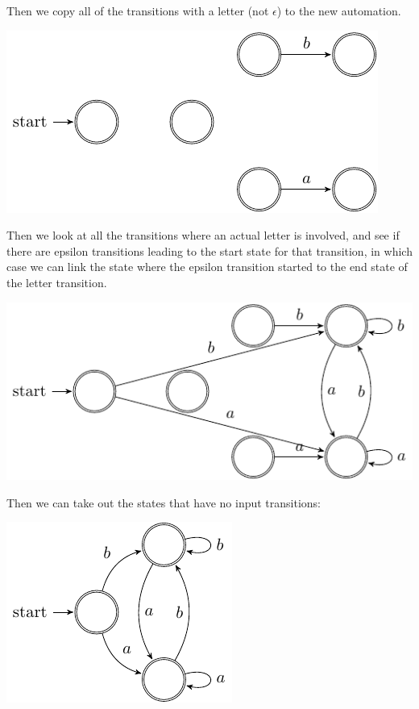 Then we copy all of the transitions with a letter (not $\epsilon$) to the new
automation.

\begin{center}
  \includegraphics{automata/25.pdf}
\end{center}

Then we look at all the transitions where an actual letter is involved, and see
if there are epsilon transitions leading to the start state for that transition,
in which case we can link the state where the epsilon transition started to the
end state of the letter transition.

\begin{center}
  \includegraphics{automata/26.pdf}
\end{center}

Then we can take out the states that have no input transitions:

\begin{center}
  \includegraphics{automata/27.pdf}
\end{center}

